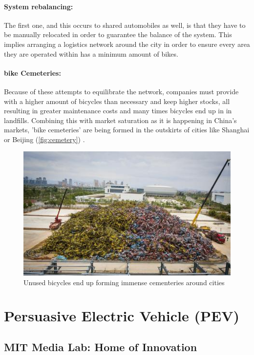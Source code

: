 \paragraph{System rebalancing:} The first one, and this occurs to shared automobiles as well, is that they have to be manually relocated in order to guarantee the balance of the system. This implies arranging a logistics network around the city in order to ensure every area they are operated within has a minimum amount of bikes.
  
\paragraph{bike Cemeteries:} Because of these attempts to equilibrate the network, companies must provide with a higher amount of bicycles than necessary and keep higher stocks, all resulting in greater maintenance costs and many times bicycles end up in in landfills. Combining this with market saturation as it is happening in China's markets, 'bike cemeteries' are being formed in the outskirts of cities like Shanghai or Beijing (\autoref{fig:cemetery}) .

\begin{figure}[htb]
  \centering
  \includegraphics[width=.9\linewidth]{pictures/01/cemetery3}
  \caption[Bike cemeteries outside cities]{Unused bicycles end up forming immense cementeries around cities}
  \label{fig:cemetery}
\end{figure}  

\section{Persuasive Electric Vehicle (PEV)}

\subsection{MIT Media Lab: Home of Innovation}

